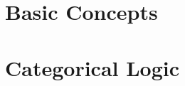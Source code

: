 \documentclass[twoside, openright]{book}
\begin{document}


\raggedright
\setlength{\parindent}{1em}
\setlength{\parskip}{1em}	

\frontmatter
\pagestyle{plain} %

	


{
\setlength{\parskip}{0em}

\renewcommand{\cftpartpresnum}{\sf\Large\partname\ }
\tableofcontents
}

	




\mainmatter
\setlength{\parindent}{1em}
\pagestyle{headings} %
\label{full_version} %

%
\part{Basic Concepts} \label{part:basic_concepts}
%	
%
%
%
\part{Categorical Logic}\label{part:cat_logic}
%
%
	
%
%
%
%
%
%
%
%
%
%
%
%
%
%
%
%
\end{document}
